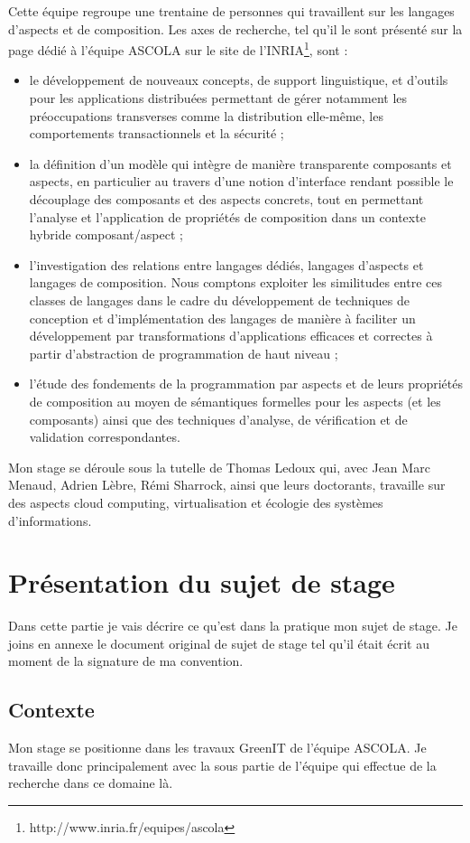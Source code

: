 \documentclass[a4paper, 11pt]{report}
\begin{document}
Cette équipe regroupe une trentaine de personnes qui travaillent sur les langages d'aspects et de composition. Les axes de recherche, tel qu'il le sont présenté sur la page dédié à l'équipe ASCOLA sur le site de l'INRIA\footnote{http://www.inria.fr/equipes/ascola}, sont :
\begin{itemize}
	\item le développement de nouveaux concepts, de support linguistique, et d'outils pour les applications distribuées permettant de gérer notamment les préoccupations transverses comme la distribution elle-même, les comportements transactionnels et la sécurité ;
	\item la définition d'un modèle qui intègre de manière transparente composants et aspects, en particulier au travers d'une notion d'interface rendant possible le découplage des composants et des aspects concrets, tout en permettant l'analyse et l'application de propriétés de composition dans un contexte hybride composant/aspect ;
	\item l'investigation des relations entre langages dédiés, langages d'aspects et langages de composition. Nous comptons exploiter les similitudes entre ces classes de langages dans le cadre du développement de techniques de conception et d'implémentation des langages de manière à faciliter un développement par transformations d'applications efficaces et correctes à partir d'abstraction de programmation de haut niveau ;
	\item l'étude des fondements de la programmation par aspects et de leurs propriétés de composition au moyen de sémantiques formelles pour les aspects (et les composants) ainsi que des techniques d'analyse, de vérification et de validation correspondantes.
\end{itemize}

Mon stage se déroule sous la tutelle de Thomas Ledoux qui, avec Jean Marc Menaud, Adrien Lèbre, Rémi Sharrock, ainsi que leurs doctorants, travaille sur des aspects cloud computing, virtualisation et écologie des systèmes d'informations.

\section{Présentation du sujet de stage}
Dans cette partie je vais décrire ce qu'est dans la pratique mon sujet de stage. Je joins en annexe le document original de sujet de stage tel qu'il était écrit au moment de la signature de ma convention.

\subsection{Contexte}
Mon stage se positionne dans les travaux GreenIT de l’équipe ASCOLA. Je travaille donc principalement avec la sous partie de l'équipe qui effectue de la recherche dans ce domaine là.
\end{document}
